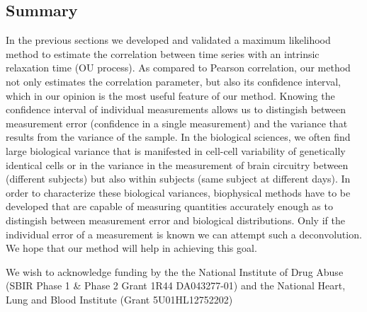 \documentclass[%
 reprint,
 amsmath,amssymb,
 aps,
]{revtex4-1}
\begin{document}
\subsection{Summary}
In the previous sections we developed and validated a maximum likelihood method to estimate the correlation between time series with an intrinsic relaxation time (OU process).  As compared to Pearson correlation, our method not only estimates the correlation parameter, but also its confidence interval, which in our opinion is the most useful feature of our method.  Knowing the confidence interval of individual measurements allows us to distingish between measurement error (confidence in a single measurement) and the variance that results from the variance of the sample.  In the biological sciences, we often find large biological variance that is manifested in cell-cell variability of genetically identical cells or in the variance in the measurement of brain circuitry between (different subjects) but also within subjects (same subject at different days).  In order to characterize these biological variances, biophysical methods have to be developed that are capable of measuring quantities accurately enough as to distingish between measurement error and biological distributions.  Only if the individual error of a measurement is known we can attempt such a deconvolution.  We hope that our method will help in achieving this goal.
\begin{acknowledgments}
We wish to acknowledge funding by the the National Institute of Drug Abuse (SBIR Phase 1 \& Phase 2 Grant 1R44 DA043277-01) and the National Heart, Lung and Blood Institute (Grant 5U01HL12752202)
\end{acknowledgments}

\end{document}

